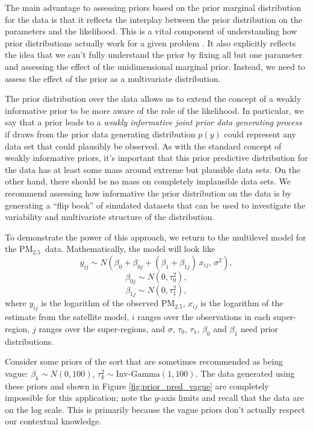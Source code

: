 \documentclass{statsoc}
\newcommand{\PM}{PM$_{2.5}$}
\begin{document}
The main advantage to assessing priors based on the prior marginal distribution
for the data is that it reflects the interplay between the prior distribution on
the parameters and the likelihood. This is a vital component of understanding
how prior distributions actually work for a given problem
\citep{gelman2017priors}. It also explicitly reflects the idea that we can't
fully understand the prior by fixing all but one parameter and assessing the
effect of the unidimensional marginal prior.  Instead, we need to assess the
effect of the prior as a multivariate distribution.

The prior distribution over the data allows us to extend the concept of a weakly
informative prior \citep{gelman2008weakly}  to be more aware of the role of the
likelihood. In particular, we say that a prior leads to a \emph{weakly
informative joint prior data generating process}  if draws from the prior data
generating distribution $p(y)$ could represent any data set that could plausibly
be observed.  As with the standard concept of weakly informative priors, it's
important that this prior predictive distribution for the data has at least some
mass around extreme but plausible data sets. On the other hand, there should be
no mass on completely implausible data sets. We recommend assessing  how
informative the prior distribution on the data is by generating a ``flip book''
of simulated datasets that can be used to investigate the variability and
multivariate structure of the distribution.

To demonstrate the power of this approach, we return to the multilevel model for
the \PM\ data. Mathematically, the model will look like
$$y_{ij} \sim N\left(\beta_0 + \beta_{0j} + (\beta_1 + \beta_{1j}) \, x_{ij}, \, \sigma^2\right),$$ 
$$\beta_{0j}  \sim N\left(0, \tau_0^2\right), $$
$$\beta_{1j} \sim N\left(0, \tau_1^2\right),$$
where $y_{ij}$ is the logarithm of the observed \PM, $x_{ij}$ is the logarithm
of the estimate from the satellite model, $i$ ranges over the observations in
each super-region, $j$ ranges over the super-regions, and $\sigma$, $\tau_0$,
$\tau_1$, $\beta_0$ and $\beta_1$ need prior distributions.

Consider some priors of the sort that are sometimes recommended as being vague:
$\beta_k \sim N(0,100)$, $\tau_k^2 \sim \text{Inv-Gamma}(1,100)$. The data
generated using these priors and shown in Figure \ref{fig:prior_pred_vague} are
completely impossible for this application; note the $y$-axis limits and recall
that the data are on the log scale.  This is primarily because the vague priors
don't actually respect our contextual knowledge.
\end{document}
